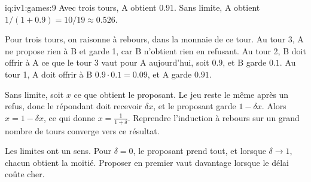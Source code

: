 \begin{solution}{iq:iv1:games:9}
Avec trois tours, A obtient $0.91$. Sans limite, A obtient $1/(1 + 0.9) = 10/19 \approx 0.526$.

Pour trois tours, on raisonne à rebours, dans la monnaie de ce tour. Au tour 3, A ne propose rien à B et garde 1, car B n'obtient rien en refusant. Au tour 2, B doit offrir à A ce que le tour 3 vaut pour A aujourd'hui, soit $0.9$, et B garde $0.1$. Au tour 1, A doit offrir à B $0.9 \cdot 0.1 = 0.09$, et A garde $0.91$.

Sans limite, soit $x$ ce que obtient le proposant. Le jeu reste le même après un refus, donc le répondant doit recevoir $\delta x$, et le proposant garde $1 - \delta x$. Alors $x = 1 - \delta x$, ce qui donne $x = \frac{1}{1 + \delta}$. Reprendre l'induction à rebours sur un grand nombre de tours converge vers ce résultat.

Les limites ont un sens. Pour $\delta = 0$, le proposant prend tout, et lorsque $\delta \to 1$, chacun obtient la moitié. Proposer en premier vaut davantage lorsque le délai coûte cher.

\end{solution}

